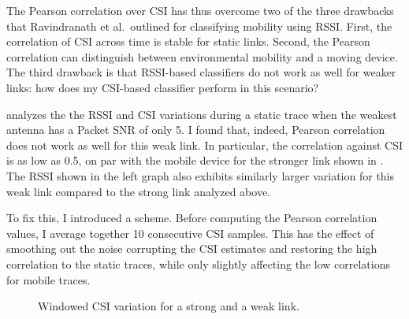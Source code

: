 The Pearson correlation over CSI has thus overcome two of the three drawbacks that Ravindranath et al.\ outlined for classifying mobility using RSSI. First, the correlation of CSI across time is stable for static links. Second, the Pearson correlation can distinguish between environmental mobility and a moving device. The third drawback is that RSSI-based classifiers do not work as well for weaker links: how does my CSI-based classifier perform in this scenario? 

 analyzes the the RSSI and CSI variations during a static trace when the weakest antenna has a Packet SNR of only 5\dB. I found that, indeed, Pearson correlation does not work as well for this weak link. In particular, the correlation against CSI is as low as 0.5, on par with the mobile device for the stronger link shown in . The RSSI shown in the left graph also exhibits similarly larger variation for this weak link compared to the strong link analyzed above.

To fix this, I introduced a  scheme. Before computing the Pearson correlation values, I average together 10 consecutive CSI samples. This has the effect of smoothing out the noise corrupting the CSI estimates and restoring the high correlation to the static traces, while only slightly affecting the low correlations for mobile traces.

\begin{figure}[tp]
	\centering
	\hspace{0.03\textwidth}%
	\caption[Windowed CSI variation for a strong and a weak link]{\label{fig:mobility_csi_cdf}Windowed CSI variation for a strong and a weak link.}
\end{figure}


